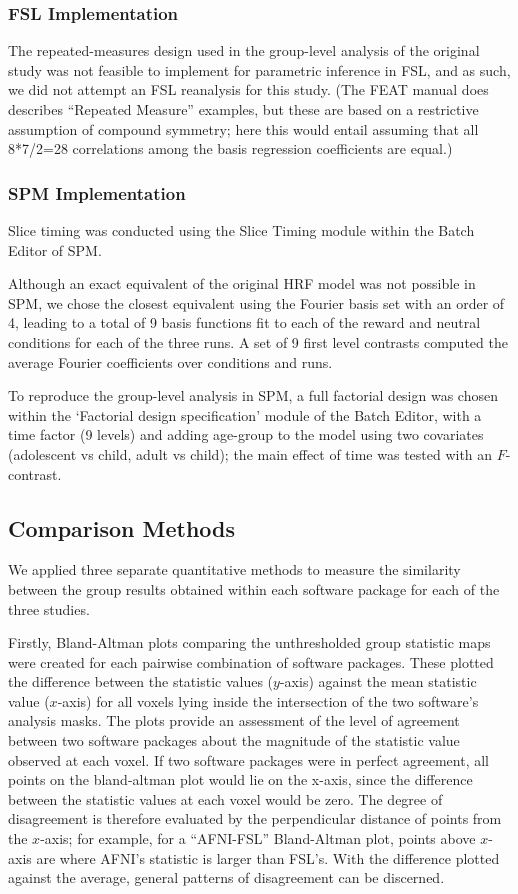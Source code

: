 \subsubsection{FSL Implementation}
The repeated-measures design used in the group-level analysis of the original study was not feasible to implement for parametric inference in FSL, and as such, we did not attempt an FSL reanalysis for this study. (The FEAT manual does describes ``Repeated Measure'' examples, but these are based on a restrictive assumption of compound symmetry; here this would entail assuming that all 8*7/2=28 correlations among the basis regression coefficients are equal.)
\subsubsection{SPM Implementation}
Slice timing was conducted using the Slice Timing module within the Batch Editor of SPM.

Although an exact equivalent of the original HRF model was not possible in SPM, we chose the closest equivalent using the Fourier basis set with an order of 4, leading to a total of 9 basis functions fit to each of the reward and neutral conditions for each of the three runs.  A set of 9 first level contrasts computed the average Fourier coefficients over conditions and runs.

To reproduce the group-level analysis in SPM, a full factorial design was chosen within the `Factorial design specification' module of the Batch Editor, with a time factor (9 levels) and adding age-group to the model using two covariates (adolescent vs child, adult vs child); the main effect of time was tested with an $F$-contrast.

\subsection{Comparison Methods}

We applied three separate quantitative methods to measure the similarity between the group results obtained within each software package for each of the three studies. 

Firstly, Bland-Altman plots comparing the unthresholded group statistic maps were created for each pairwise combination of software packages. These plotted the difference between the statistic values ($y$-axis) against the mean statistic value ($x$-axis) for all voxels lying inside the intersection of the two software's analysis masks. The plots provide an assessment of the level of agreement between two software packages about the magnitude of the statistic value observed at each voxel. If two software packages were in perfect agreement, all points on the bland-altman plot would lie on the x-axis, since the difference between the statistic values at each voxel would be zero. The degree of disagreement is therefore evaluated by the perpendicular distance of points from the $x$-axis; for example, for a ``AFNI-FSL'' Bland-Altman plot, points above $x$-axis are where AFNI's statistic is larger than FSL's. With the difference plotted against the average, general patterns of disagreement can be discerned.


